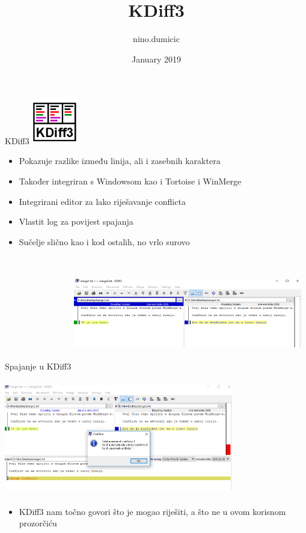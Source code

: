 \documentclass{beamer}
\title{KDiff3}
\author{nino.dumicic }
\date{January 2019}
\begin{document}
\maketitle
\begin{frame}{KDiff3}
    \includegraphics[width=2cm, height=2cm]{kdiff1.png}
    \begin{itemize}
        \item Pokazuje razlike između linija, ali i zasebnih karaktera
        \item Također integriran s Windowsom kao i Tortoise i WinMerge
        \item Integrirani editor za lako riješavanje conflicta
        \item Vlastit log za povijest spajanja
        \item Sučelje slično kao i kod ostalih, no vrlo surovo
    \end{itemize}
\end{frame}
\begin{frame}{Spajanje u KDiff3}
    \includegraphics[width=10cm, height=5cm]{kdiff2.png}
    
\end{frame}
    \begin{frame}
    \includegraphics[width=10cm, height=5cm]{kdiff3.png}
    \begin{itemize}
        \item KDiff3 nam točno govori što je mogao riješiti, a što ne u ovom korisnom prozorčiću
    \end{itemize}
    
\end{frame}
\end{document}
